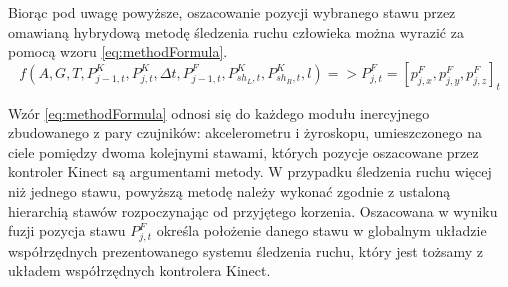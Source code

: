 Biorąc pod uwagę powyższe, oszacowanie pozycji wybranego stawu przez omawianą hybrydową metodę śledzenia ruchu człowieka można wyrazić za pomocą wzoru \eqref{eq:methodFormula}.
\begin{equation}
	f(A,G,T,P_{j-1,t}^K,P_{j,t}^K,\Delta t, P^F_{j-1,t}, P^K_{sh_L,t},P^K_{sh_R,t},l) => P^F_{j,t} = [p_{j,x}^F,p_{j,y}^F,p_{j,z}^F]_t
	\label{eq:methodFormula}
\end{equation}


Wzór \eqref{eq:methodFormula} odnosi się do każdego modułu inercyjnego zbudowanego z pary czujników: akcelerometru i żyroskopu, umieszczonego na ciele pomiędzy dwoma kolejnymi stawami, których pozycje oszacowane przez kontroler Kinect są argumentami metody. W przypadku śledzenia ruchu więcej niż jednego stawu, powyższą metodę należy wykonać zgodnie z ustaloną hierarchią stawów rozpoczynając od przyjętego korzenia. Oszacowana w wyniku fuzji pozycja stawu $P^F_{j,t}$ określa położenie danego stawu w globalnym układzie współrzędnych prezentowanego systemu śledzenia ruchu, który jest tożsamy z układem współrzędnych kontrolera Kinect.

